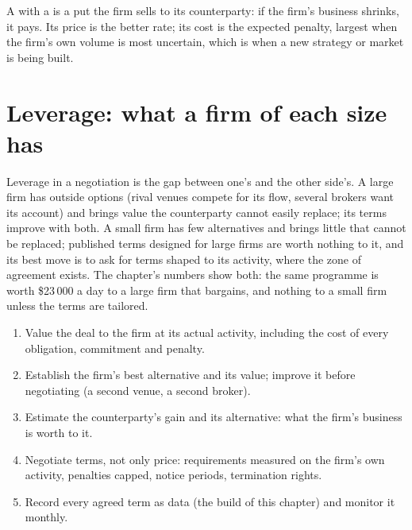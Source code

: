 \begin{remark}\label{rem:fm:commercial-relationships-with-venues-brokers-and-vendors:commit}
A  with a  is a put the firm sells to its counterparty: if the firm's business shrinks, it pays. Its price is the
better rate; its cost is the expected penalty, largest when the firm's own volume is most uncertain, which is when a new strategy or market is
being built.
\end{remark}

\section{Leverage: what a firm of each size has}

Leverage in a negotiation is the gap between one's  and the other side's. A large firm has outside options (rival venues compete
for its flow, several brokers want its account) and brings value the counterparty cannot easily replace; its terms improve with both. A small firm
has few alternatives and brings little that cannot be replaced; published terms designed for large firms are worth nothing to it, and its best
move is to ask for terms shaped to its activity, where the zone of agreement exists. The chapter's numbers show both: the same programme is
worth \$23\,000 a day to a large firm that bargains, and nothing to a small firm unless the terms are tailored.

\begin{method}\label{met:fm:commercial-relationships-with-venues-brokers-and-vendors:negotiate}
\begin{enumerate}
\item Value the deal to the firm at its actual activity, including the cost of every obligation, commitment and penalty.
\item Establish the firm's best alternative and its value; improve it before negotiating (a second venue, a second broker).
\item Estimate the counterparty's gain and its alternative: what the firm's business is worth to it.
\item Negotiate terms, not only price: requirements measured on the firm's own activity, penalties capped, notice periods, termination rights.
\item Record every agreed term as data (the build of this chapter) and monitor it monthly.
\end{enumerate}
\end{method}

